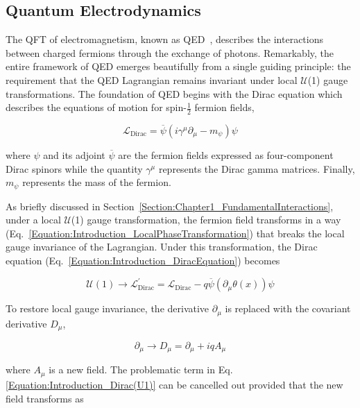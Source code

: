 \subsection{Quantum Electrodynamics}

The QFT of electromagnetism, known as \ac{QED}~\cite{QED}, describes the interactions between charged fermions through the exchange of photons. Remarkably, the entire framework of QED emerges beautifully from a single guiding principle: the requirement that the QED Lagrangian remains invariant under local $\mathcal{U}$(1) gauge transformations. The foundation of QED begins with the Dirac equation \cite{MarkThompson} which describes the equations of motion for spin-$\frac{1}{2}$ fermion fields,

\begin{equation}
    \mathcal{L}_{\text{Dirac}} = \overline{\psi}(i\gamma^\mu \partial_\mu - m_{\psi}) \psi
\label{Equation:Introduction_DiracEquation}
\end{equation}

where $\psi$ and its adjoint $\overline{\psi}$ are the fermion fields expressed as four-component Dirac spinors while the quantity $\gamma^\mu$ represents the Dirac gamma matrices. Finally, $m_{\psi}$ represents the mass of the fermion.

As briefly discussed in Section~\ref{Section:Chapter1_FundamentalInteractions}, under a local $\mathcal{U}$(1) gauge transformation, the fermion field transforms in a way (Eq.~\ref{Equation:Introduction_LocalPhaseTransformation}) that breaks the local gauge invariance of the Lagrangian. Under this transformation, the Dirac equation (Eq.~\ref{Equation:Introduction_DiracEquation}) becomes

\begin{equation}
    \mathcal{U}(1) \rightarrow \mathcal{L}_{\text{Dirac}}^{\prime} = \mathcal{L}_{\text{Dirac}} - q\overline{\psi}(\partial_\mu\theta(x))\psi
\label{Equation:Introduction_Dirac(U1)}
\end{equation}

To restore local gauge invariance, the derivative $\partial_\mu$ is replaced with the covariant derivative $D_\mu$,

\begin{equation}
    \partial_\mu \rightarrow D_\mu = \partial_\mu + iqA_\mu
\end{equation}

where $A_\mu$ is a new field. The problematic term in Eq.\ref{Equation:Introduction_Dirac(U1)} can be cancelled out provided that the new field transforms as

